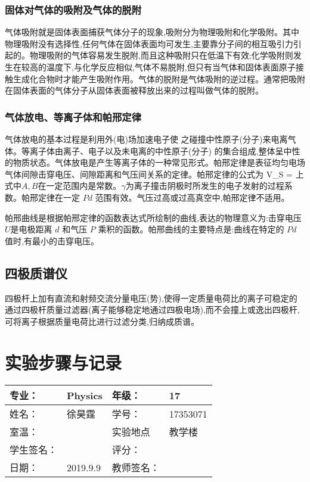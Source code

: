 \documentclass{article}
\begin{document}
\subsubsection{固体对气体的吸附及气体的脱附}
气体吸附就是固体表面捕获气体分子的现象,吸附分为物理吸附和化学吸附。其中物理吸附没有选择性,任何气体在固体表面均可发生,主要靠分子间的相互吸引力引起的。物理吸附的气体容易发生脱附,而且这种吸附只在低温下有效;化学吸附则发生在较高的温度下,与化学反应相似,气体不易脱附,但只有当气体和固体表面原子接触生成化合物时才能产生吸附作用。气体的脱附是气体吸附的逆过程。通常把吸附在固体表面的气体分子从固体表面被释放出来的过程叫做气体的脱附。
\subsubsection{气体放电、等离子体和帕邢定律}
气体放电的基本过程是利用外(电)场加速电子使
之碰撞中性原子(分子)来电离气体。等离子体由离子、电子以及未电离的中性原子(分子)
的集合组成,整体呈中性的物质状态。气体放电是产生等离子体的一种常见形式。帕邢定律是表征均匀电场气体间隙击穿电压、间隙距离和气压间关系的定律。帕邢定律的公式为
\beq
V_S = 
\eeq
上式中$A,B$在一定范围内是常数。$\gamma$为离子撞击阴极时所发生的电子发射的过程系数。帕邢定律在一定 $Pd$ 范围有效。气压过高或过高真空中,帕邢定律不适用。

帕邢曲线是根据帕邢定律的函数表达式所绘制的曲线,表达的物理意义为:击穿电压$U$是电极距离 $d$ 和气压 $P$ 乘积的函数。帕邢曲线的主要特点是:曲线在特定的 $Pd$ 值时,有最小的击穿电压。
\subsection{四极质谱仪}
四极杆上加有直流和射频交流分量电压(势),使得一定质量电荷比的离子可稳定的通过四极杆质量过滤器(离子能够稳定地通过四极电场),而不会撞上或逸出四极杆,可将离子根据质量电荷比进行过滤分类,归纳成质谱。
\newpage
\section{实验步骤与记录}
\begin{tabular}{|p{8em}|p{8em}|p{8em}|p{8em}|}
	\hline 
	专业：     &Physics       &年级：      & 17     \\
	\hline
	姓名：& 徐昊霆 &学号：&17353071  \\
	\hline
	室温：&                    &实验地点 & 教学楼 \\
	\hline	
	学生签名： & & 评分： & \\
	\hline
	日期： & 2019.9.9 & 教师签名：&  \\
	\hline
\end{tabular}
\end{document}
